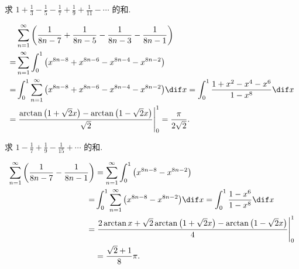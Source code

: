 \documentclass[color=green,titlestyle=hang]{elegantbook}%
\begin{document}
\begin{exercise}求 $1 + \frac{1}{3} - \frac{1}{5} - \frac{1}{7} + \frac{1}{9} + \frac{1}{{11}} - \cdots$ 的和.
\end{exercise}\begin{solution}
\begin{align*}&\sum\limits_{n = 1}^\infty {\left( {\frac{1}{{8n - 7}} + \frac{1}{{8n - 5}} - \frac{1}{{8n - 3}} - \frac{1}{{8n - 1}}} \right)} \\
=& \sum\limits_{n = 1}^\infty {\int_0^1 {\left( {{x^{8n - 8}} + {x^{8n - 6}} - {x^{8n - 4}} - {x^{8n - 2}}} \right)} } \\=& \int_0^1 {\sum\limits_{n = 1}^\infty {\left( {{x^{8n - 8}} + {x^{8n - 6}} - {x^{8n - 4}} - {x^{8n - 2}}} \right)} \dif x} = \int_0^1 {\frac{{1 + {x^2} - {x^4} - {x^6}}}{{1 - {x^8}}}\dif x} \\= &\left. {\frac{{\arctan \left( {1 + \sqrt 2 x} \right) - \arctan \left( {1 - \sqrt 2 x} \right)}}{{\sqrt 2 }}} \right|_0^1 = \frac{\pi }{{2\sqrt 2 }}.\end{align*}
\end{solution}

\begin{exercise}
求 $1 - \frac{1}{7} + \frac{1}{9} - \frac{1}{{15}} + \cdots$ 的和.	
\end{exercise}\begin{solution}
\begin{align*}\sum\limits_{n = 1}^\infty {\left( {\frac{1}{{8n - 7}} - \frac{1}{{8n - 1}}} \right)} &= \sum\limits_{n = 1}^\infty {\int_0^1 {\left( {{x^{8n - 8}} - {x^{8n - 2}}} \right)} } \\=& \int_0^1 {\sum\limits_{n = 1}^\infty {\left( {{x^{8n - 8}} - {x^{8n - 2}}} \right)} \dif x} = \int_0^1 {\frac{{1 - {x^6}}}{{1 - {x^8}}}\dif x} \\= &\left. {\frac{{2\arctan x + \sqrt 2 \arctan \left( {1 + \sqrt 2 x} \right) - \arctan \left( {1 - \sqrt 2 x} \right)}}{4}} \right|_0^1 \\
&= \frac{{\sqrt 2 + 1}}{8}\pi .
\end{align*}
\end{solution}
\end{document}
